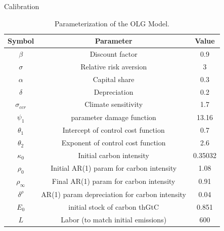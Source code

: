 \documentclass[aspectratio=1610]{beamer}
\begin{document}
\begin{frame}[fragile]{Calibration}
\begin{table}[]
    \centering
    \begin{tabular}{ccc}
    \hline \hline
  \textbf{Symbol} & \textbf{Parameter} & \textbf{Value} \\
    \hline
    $\beta$  & Discount factor& 0.9 \\
    $\sigma$  & Relative risk aversion & 3 \\
    $\alpha$  & Capital share & 0.3 \\
    $\delta$  &Depreciation & 0.2 \\
    $\sigma_{ccr}$  & Climate sensitivity & 1.7 \\
    $\psi_1$  & parameter damage function & 13.16 \\
    $\theta_1$  & Intercept of control cost function & 0.7 \\
    $\theta_2$  & Exponent of control cost function & 2.6 \\
    $\kappa_{0}$  & Initial carbon intensity & 0.35032 \\
    $\rho_0$  & Initial AR(1) param for carbon intensity & 1.08 \\
    $\rho_{\infty}$  & Final AR(1) param for carbon intensity & 0.91 \\
    $\delta^{\rho}$  & AR(1) param depreciation for carbon intensity  & 0.04 \\
    $E_0$ & initial stock of carbon thGtC& 0.851 \\
    $L$ & Labor (to match initial emissions) & 600 \\
    \hline
\end{tabular}
    \caption{Parameterization of the OLG Model.}
    \label{tab:parameters}
\end{table}

\end{frame}
\end{document}
